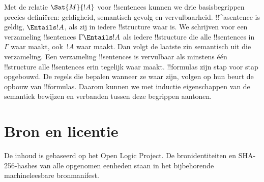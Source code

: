 \documentclass[openany]{memoir}
\begin{document}
Met de relatie $\Sat{M}{!A}$ voor !!{sentence}s kunnen we drie
basisbegrippen precies definiëren: geldigheid, semantisch gevolg en
vervulbaarheid. !!^a{sentence} is geldig, $\Entails !A$, als zij in
iedere !!{structure} waar is. We schrijven voor een verzameling
!!{sentence}s $\Gamma \Entails !A$ als iedere !!{structure} die alle
!!{sentence}s in~$\Gamma$ waar maakt, ook~$!A$ waar maakt. Dan volgt de
laatste zin semantisch uit die verzameling. Een verzameling
!!{sentence}s is vervulbaar als minstens één !!{structure} alle
!!{sentence}s erin tegelijk waar maakt. !!{formula}s zijn stap voor
stap opgebouwd. De regels die bepalen wanneer ze waar zijn, volgen op
hun beurt de opbouw van !!{formula}s. Daarom kunnen we met inductie
eigenschappen van de semantiek bewijzen en verbanden tussen deze
begrippen aantonen.
\endgroup
\OLEndChapterHook
\OLEndPartHook

\clearpage
\chapter*{Bron en licentie}
De inhoud is gebaseerd op het Open Logic Project. De bronidentiteiten en
SHA-256-hashes van alle opgenomen eenheden staan in het bijbehorende
machineleesbare bronmanifest.


\end{document}
